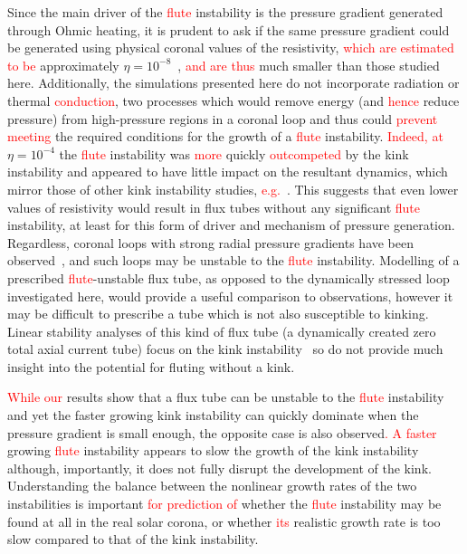\documentclass[12pt]{article}
\newcommand{\rs}[2]{\textcolor{red}{#2}}
\begin{document}
Since the main driver of the \rs{fluting}{flute} instability is the
pressure gradient generated through Ohmic heating, it is prudent to
ask if the same pressure gradient could be generated using physical
coronal values of the resistivity, \rs{of}{which are estimated to be}
approximately
$\eta=10^{-8}$~\cite{craigAnisotropicViscousDissipation2009a},
\rs{which are}{and are thus} much smaller than those studied
here. Additionally, the simulations presented here do not incorporate
radiation or thermal \rs{conductivity}{conduction}, two processes which would remove
energy (and \rs{thus}{hence} reduce pressure) from high-pressure regions in a coronal
loop and thus could \rs{remove}{prevent meeting} the required
conditions for the growth of a 
\rs{fluting}{flute} instability. \rs{Where}{Indeed, at} $\eta=10^{-4}$ the
\rs{fluting}{flute} instability was \rs{}{more} quickly \rs{dominated}{outcompeted} by the kink
instability and appeared to have little impact on the resultant
dynamics, which mirror those of other kink instability studies, \rs{such
as~}{e.g.~}\cite{hoodCoronalHeatingMagnetic2009}. This suggests that even
lower values of resistivity would result in flux tubes without any
significant \rs{fluting}{flute} instability, at least for this form of
driver and mechanism of pressure generation. Regardless, coronal loops
with strong radial pressure gradients have been
observed~\cite{foukalTemperatureStructurePressure1975}, and such loops
may be unstable to the \rs{fluting}{flute} instability. Modelling of a
prescribed \rs{fluting}{flute}-unstable flux tube, as opposed to the dynamically
stressed loop investigated here, would provide a useful comparison to
observations, however it may be difficult to prescribe a tube which is
not also susceptible to kinking. Linear stability analyses of this
kind of flux tube (a dynamically created zero total axial current
tube) focus on the kink
instability~\cite{browningSolarCoronalHeating2003b} so do not provide
much insight into the potential for fluting without a kink. 

\rs{These}{While our} results show that a flux tube can be unstable to
the \rs{fluting}{flute} instability and yet the faster growing kink
instability can quickly dominate when the pressure gradient is small
enough\rs{. However}{}, the opposite case is also observed\rs{,
  where}{. A faster} growing \rs{fluting}{flute} instability appears to slow the growth of
the kink instability although, importantly, it does not fully disrupt
the development of the kink. Understanding the balance between the
nonlinear growth rates of the two instabilities is important \rs{in
understanding}{for prediction of} whether the \rs{fluting}{flute} instability may be found
at all in the real solar corona, or whether \rs{a}{its} realistic growth rate is
too slow compared to that of the kink instability. 
\end{document}
